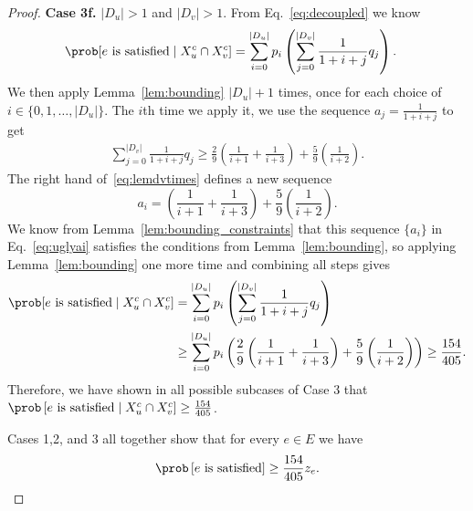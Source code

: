 \begin{proof}
	\noindent
	\textbf{Case 3f.} $|D_u| > 1$ and $|D_v| > 1$.
	From Eq.~\eqref{eq:decoupled} we know
	\begin{align*}
		\prob[ e \text{ is satisfied} \mid X_u^c \cap X_v^c ] & = \sum_{i = 0}^{|D_u|}  p_i \left(\sum_{j = 0}^{|D_v|} \frac{1}{1+i+j}  q_j \right).
	\end{align*}
	We then apply Lemma~\ref{lem:bounding} $|D_u|+1$ times, once for each choice of $i \in \{0,1, \hdots, |D_u|\}$. The $i$th time we apply it, we use the sequence $a_j = \frac{1}{1+i+j}$ to get
	\begin{align}
		\label{eq:lemdvtimes}
		\sum_{j = 0}^{|D_v|} \frac{1}{1+i+j}  q_j \geq \frac{2}{9}\left( \frac{1}{i+1} + \frac{1}{i+3} \right) + \frac{5}{9} \left( \frac{1}{i+2} \right).
	\end{align}
	The right hand of~\eqref{eq:lemdvtimes} defines a new sequence
	\begin{equation}
		\label{eq:uglyai}
		a_i = \left( \frac{1}{i+1} + \frac{1}{i+3} \right) + \frac{5}{9} \left( \frac{1}{i+2} \right).
	\end{equation}
	We know from Lemma~\ref{lem:bounding_constraints} that this sequence $\{a_i\}$ in Eq.~\eqref{eq:uglyai} satisfies the conditions from Lemma~\ref{lem:bounding}, so applying Lemma~\ref{lem:bounding} one more time and combining all steps gives
	\begin{align*}
		\prob[ e \text{ is satisfied} \mid X_u^c \cap X_v^c ] & = \sum_{i = 0}^{|D_u|}  p_i \left(\sum_{j = 0}^{|D_v|} \frac{1}{1+i+j}  q_j \right) \\
		&\geq \sum_{i = 0}^{|D_u|}  p_i \left( \frac{2}{9}\left( \frac{1}{i+1} + \frac{1}{i+3} \right) + \frac{5}{9} \left( \frac{1}{i+2} \right) \right) \geq \frac{154}{405}.
	\end{align*}
	Therefore, we have shown in all possible subcases of Case 3 that $\prob\left[ \text{$e$ is satisfied} \mid X_u^c \cap X_v^c \right] \geq \frac{154}{405}$.

	Cases 1,2, and 3 all together show that for every $e \in E$ we have
	\[
		\prob\left[ \text{$e$ is satisfied} \right] \geq \frac{154}{405} z_e.
	\]
\end{proof}